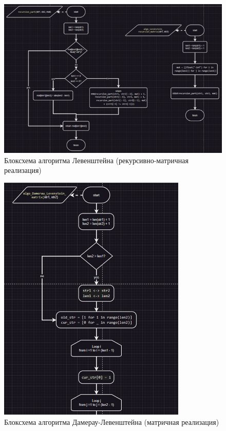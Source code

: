 \documentclass[a4paper,12pt]{article}
\begin{document}
\begin{figure}[H]
    \centering
    \includegraphics[width=1\textwidth]{block_1_3.png}
    \caption{Блоксхема алгоритма Левенштейна (рекурсивно-матричная реализация)}
\end{figure}
\begin{figure}[H]
    \centering
    \includegraphics[width=0.8\textwidth]{block_2_1_1.png}
    \caption{Блоксхема алгоритма Дамерау-Левенштейна (матричная реализация)}
\end{figure}
\end{document}
